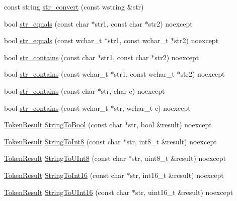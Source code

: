\begin{DoxyCompactItemize}
\item 
const string \hyperlink{namespacemage_a5425aab167b483cdf05a6aaf0d074ed1}{str\+\_\+convert} (const wstring \&str)
\item 
bool \hyperlink{namespacemage_a68b152487f458f47538999e2c21812bf}{str\+\_\+equals} (const char $\ast$str1, const char $\ast$str2) noexcept
\item 
bool \hyperlink{namespacemage_a8d39e92601eeb1c191d8f82ae9b44bc4}{str\+\_\+equals} (const wchar\+\_\+t $\ast$str1, const wchar\+\_\+t $\ast$str2) noexcept
\item 
bool \hyperlink{namespacemage_a22965dd02291bbb3a4a142ee50ebd282}{str\+\_\+contains} (const char $\ast$str1, const char $\ast$str2) noexcept
\item 
bool \hyperlink{namespacemage_aee1191b352f7efdcac46e8431ecac15d}{str\+\_\+contains} (const wchar\+\_\+t $\ast$str1, const wchar\+\_\+t $\ast$str2) noexcept
\item 
bool \hyperlink{namespacemage_acebec240ea9de5904a7519acf2d1da6f}{str\+\_\+contains} (const char $\ast$str, char c) noexcept
\item 
bool \hyperlink{namespacemage_a254ec6c3b5d4ce94be18cda1da90e916}{str\+\_\+contains} (const wchar\+\_\+t $\ast$str, wchar\+\_\+t c) noexcept
\item 
\hyperlink{namespacemage_a2178ba2411db5912f41b2e7698c2037d}{Token\+Result} \hyperlink{namespacemage_a2048d366ef3fdb8f7a40feb2fc1af862}{String\+To\+Bool} (const char $\ast$str, bool \&result) noexcept
\item 
\hyperlink{namespacemage_a2178ba2411db5912f41b2e7698c2037d}{Token\+Result} \hyperlink{namespacemage_ac8df2a507abe8003a58db29a07ae756d}{String\+To\+Int8} (const char $\ast$str, int8\+\_\+t \&result) noexcept
\item 
\hyperlink{namespacemage_a2178ba2411db5912f41b2e7698c2037d}{Token\+Result} \hyperlink{namespacemage_a7934be6d4a4935c33fb7ac75b1a06afc}{String\+To\+U\+Int8} (const char $\ast$str, uint8\+\_\+t \&result) noexcept
\item 
\hyperlink{namespacemage_a2178ba2411db5912f41b2e7698c2037d}{Token\+Result} \hyperlink{namespacemage_aa3ebcac7a0f0e391f89865180788a023}{String\+To\+Int16} (const char $\ast$str, int16\+\_\+t \&result) noexcept
\item 
\hyperlink{namespacemage_a2178ba2411db5912f41b2e7698c2037d}{Token\+Result} \hyperlink{namespacemage_a10d0fbcf60e6870cf742f5590b3e1e01}{String\+To\+U\+Int16} (const char $\ast$str, uint16\+\_\+t \&result) noexcept
\item 

\end{DoxyCompactItemize}
